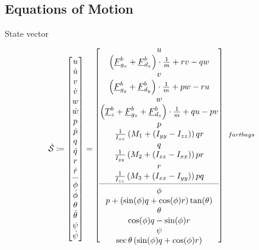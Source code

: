 \subsection{Equations of Motion}
State vector \state
\[
\dot{\mstate} \coloneqq\begin{bmatrix}
u\\\dot{u}\\v\\\dot{v}\\w\\\dot{w}\\
p\\\dot{p}\\q\\\dot{q}\\r\\\dot{r}\\
\cmidrule(lr){1-1}
\phi\\\dot{\phi}\\\theta\\\dot{\theta}\\\psi\\\dot{\psi}
\end{bmatrix}=\begin{blockarray}{cl}
\begin{block}{[c]l}
u&\\\left(\colvec{F}_{g_x}^b+\colvec{F}_{d_x}^b\right)\cdot\frac{1}{m}+rv-qw&\\
v&\\\left(\colvec{F}_{g_y}^b+\colvec{F}_{d_y}^b\right)\cdot\frac{1}{m}+pw-ru&\\
w&\\\left(\colvec{T}^b_z+\colvec{F}_{g_z}^b+\colvec{F}_{d_z}^b\right)\cdot\frac{1}{m}+qu-pv&\\
p&\\\frac{1}{I_{xx}}\left(M_1+(I_{yy}-I_{zz})\right)qr&\mLabel{fartbags}\\
q&\\\frac{1}{I_{yy}}\left(M_2+\left(I_{zz}-I_{xx}\right)\right)pr&\\
r&\\\frac{1}{I_{zz}}\left(M_3+\left(I_{xx}-I_{yy}\right)\right)pq&\\
\cmidrule(lr){1-1}
\phi&\\p+\left(\sin(\phi)q+\cos(\phi)r\right)\tan(\theta)&\\
\theta&\\\cos(\phi)q-\sin(\phi)r&\\
\psi&\\\sec{\theta}\left(\sin(\phi)q+\cos(\phi)r\right)&\\
\end{block}
\end{blockarray}
\]
